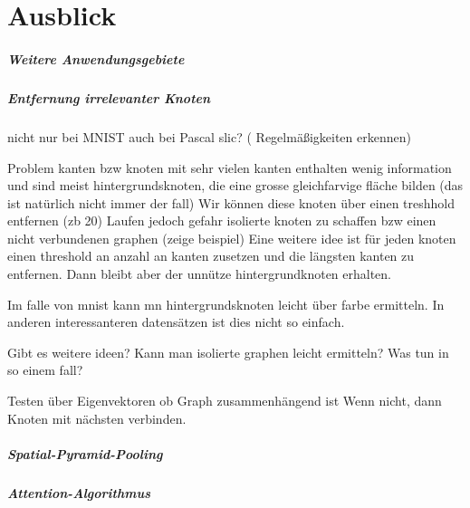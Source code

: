 \chapter{Ausblick}
\label{ausblick}

\paragraph{Weitere Anwendungsgebiete}
\label{weitere_anwendungsgebiete}

\paragraph{Entfernung irrelevanter Knoten}
\label{entfernung_irrelevanter_knoten}

nicht nur bei \gls{MNIST}
auch bei \gls{Pascal} slic? (\zB{} Regelmäßigkeiten erkennen)

Problem kanten bzw knoten mit sehr vielen kanten enthalten wenig information und sind meist hintergrundsknoten, die eine grosse gleichfarvige fläche bilden (das ist natürlich nicht immer der fall)
Wir können diese knoten über einen treshhold entfernen (zb 20)
Laufen jedoch gefahr isolierte knoten zu schaffen bzw einen nicht verbundenen graphen (zeige beispiel)
 Eine weitere idee ist für jeden knoten einen threshold an anzahl an kanten zusetzen und die längsten kanten zu entfernen. Dann bleibt aber der unnütze hintergrundknoten erhalten.

Im falle von mnist kann mn hintergrundsknoten leicht über farbe ermitteln.
In anderen interessanteren datensätzen ist dies nicht so einfach.

Gibt es weitere ideen?
Kann man isolierte graphen leicht ermitteln? Was tun in so einem fall?

Testen über Eigenvektoren ob Graph zusammenhängend ist
Wenn nicht, dann Knoten mit nächsten verbinden.

\paragraph{Spatial-Pyramid-Pooling}
\label{spatial_pyramid_pooling}

\paragraph{Attention-Algorithmus}
\label{attention_algorithmus}
